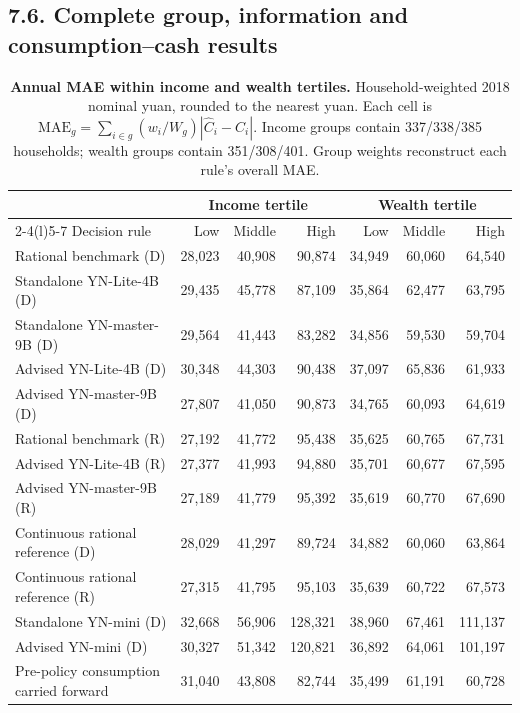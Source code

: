 \subsection*{7.6. Complete group, information and consumption--cash results}
\begingroup
\setlength{\intextsep}{5pt}
\captionsetup{font=footnotesize,skip=3pt}
\begin{table}[H]
\centering\footnotesize
\setlength{\tabcolsep}{3pt}
\begin{tabularx}{\textwidth}{@{}Xrrrrrr@{}}
\toprule
 & \multicolumn{3}{c}{Income tertile} & \multicolumn{3}{c}{Wealth tertile}\\
\cmidrule(lr){2-4}\cmidrule(l){5-7}
Decision rule & Low & Middle & High & Low & Middle & High\\
\midrule
Rational benchmark (D) & 28,023 & 40,908 & 90,874 & 34,949 & 60,060 & 64,540\\
Standalone YN-Lite-4B (D) & 29,435 & 45,778 & 87,109 & 35,864 & 62,477 & 63,795\\
Standalone YN-master-9B (D) & 29,564 & 41,443 & 83,282 & 34,856 & 59,530 & 59,704\\
Advised YN-Lite-4B (D) & 30,348 & 44,303 & 90,438 & 37,097 & 65,836 & 61,933\\
Advised YN-master-9B (D) & 27,807 & 41,050 & 90,873 & 34,765 & 60,093 & 64,619\\
\midrule
Rational benchmark (R) & 27,192 & 41,772 & 95,438 & 35,625 & 60,765 & 67,731\\
Advised YN-Lite-4B (R) & 27,377 & 41,993 & 94,880 & 35,701 & 60,677 & 67,595\\
Advised YN-master-9B (R) & 27,189 & 41,779 & 95,392 & 35,619 & 60,770 & 67,690\\
\midrule
Continuous rational reference (D) & 28,029 & 41,297 & 89,724 & 34,882 & 60,060 & 63,864\\
Continuous rational reference (R) & 27,315 & 41,795 & 95,103 & 35,639 & 60,722 & 67,573\\
\midrule
Standalone YN-mini (D) & 32,668 & 56,906 & 128,321 & 38,960 & 67,461 & 111,137\\
Advised YN-mini (D) & 30,327 & 51,342 & 120,821 & 36,892 & 64,061 & 101,197\\
\midrule
Pre-policy consumption carried forward & 31,040 & 43,808 & 82,744 & 35,499 & 61,191 & 60,728\\
\bottomrule
\end{tabularx}
\caption{\textbf{Annual MAE within income and wealth tertiles.} Household-weighted 2018 nominal yuan, rounded to the nearest yuan. Each cell is $\mathrm{MAE}_g=\sum_{i\in g}(w_i/W_g)|\widehat C_i-C_i|$. Income groups contain 337/338/385 households; wealth groups contain 351/308/401. Group weights reconstruct each rule's overall MAE.}
\label{hh:tab:group-mae}
\end{table}

